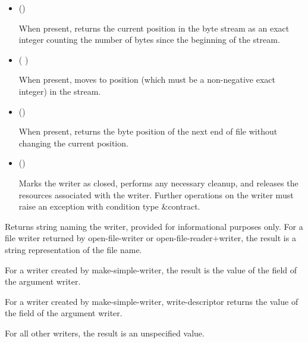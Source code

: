\begin{entry}{%
}
\begin{itemize}
   may or may not be a bytes object returned by {\cf
    make-i/o-buffer}.
  
   may or may not be the same as the chunk size of the
  reader.

\item {\cf ()}
   
  When present,  returns the current position in the byte
  stream as an exact integer counting the number of bytes since the
  beginning of the stream.
   
\item {\cf ( )}
   
  When present,  moves to position  (which must be a
  non-negative exact integer) in the stream.
  
\item {\cf ()}
   
    When present,  returns the byte position of the next end
    of file without changing the current position.
   
\item {\cf ()}
  
  Marks the writer as closed, performs any necessary
  cleanup, and releases the resources associated with the writer. Further
  operations on the writer must raise an exception with condition type
  {\cf\&contract}.
\end{itemize}
\end{entry}

\begin{entry}{%
}
   
Returns string naming the writer, provided for informational
purposes only. For a file writer returned by {\cf open-file-writer}
or {\cf open-file-reader+writer}, the result is a string
representation of the file name.
   
For a writer created by {\cf make-simple-writer}, the result is the
value of the  field of the argument writer.
\end{entry}

\begin{entry}{%
}
   
  For a writer created by {\cf make-simple-writer}, {\cf write-descriptor} 
  returns the value of the
   field of the argument writer.
  
  For all other writers, the result is an unspecified value.
\end{entry}


